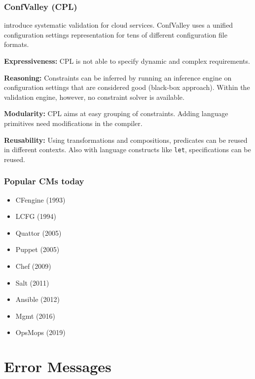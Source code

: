 \begin{frame}
	\frametitle{ConfValley (CPL)}

	\citet{huang2015confvalley} introduce systematic validation for cloud services.
	ConfValley uses a unified configuration settings representation for tens of different configuration file formats.

	\textbf{Expressiveness:}
	CPL is not able to specify dynamic and complex requirements.

	\textbf{Reasoning:}
	Constraints can be inferred by running an inference engine on configuration settings that are considered good (black-box approach).
	Within the validation engine, however, no constraint solver is available.

	\textbf{Modularity:}
	CPL aims at easy grouping of constraints.
	Adding language primitives need modifications in the compiler.

	\textbf{Reusability:}
	Using transformations and compositions, predicates can be reused in different contexts.
	Also with language constructs like \texttt{let}, specifications can be reused.
\end{frame}

\begin{frame}
	\frametitle{Popular CMs today}

	\begin{itemize}[<+-| alert@+>]
	\item CFengine (1993)
	\item LCFG (1994)
	\item Quattor (2005)
	\item Puppet (2005)
	\item Chef (2009)
	\item Salt (2011)
	\item Ansible (2012)
	\item Mgmt (2016)
	\item OpsMops (2019)
	\end{itemize}
\end{frame}



\section{Error Messages}

\subsection{}

